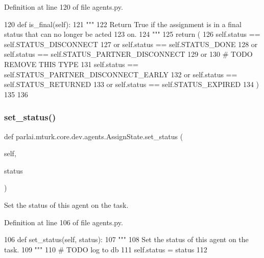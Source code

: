 Definition at line 120 of file agents.\+py.


\begin{DoxyCode}
120     \textcolor{keyword}{def }is\_final(self):
121         \textcolor{stringliteral}{"""}
122 \textcolor{stringliteral}{        Return True if the assignment is in a final status that can no longer be acted}
123 \textcolor{stringliteral}{        on.}
124 \textcolor{stringliteral}{        """}
125         \textcolor{keywordflow}{return} (
126             self.status == self.STATUS\_DISCONNECT
127             \textcolor{keywordflow}{or} self.status == self.STATUS\_DONE
128             \textcolor{keywordflow}{or} self.status == self.STATUS\_PARTNER\_DISCONNECT
129             \textcolor{keywordflow}{or}
130             \textcolor{comment}{# TODO REMOVE THIS TYPE}
131             self.status == self.STATUS\_PARTNER\_DISCONNECT\_EARLY
132             \textcolor{keywordflow}{or} self.status == self.STATUS\_RETURNED
133             \textcolor{keywordflow}{or} self.status == self.STATUS\_EXPIRED
134         )
135 
136 
\end{DoxyCode}
\mbox{\label{classparlai_1_1mturk_1_1core_1_1dev_1_1agents_1_1AssignState_a8a4989ac979fca506d8249d3a749ca0c}} 
\subsubsection{\texorpdfstring{set\+\_\+status()}{set\_status()}}
{\footnotesize\ttfamily def parlai.\+mturk.\+core.\+dev.\+agents.\+Assign\+State.\+set\+\_\+status (\begin{DoxyParamCaption}\item[{}]{self,  }\item[{}]{status }\end{DoxyParamCaption})}

\begin{DoxyVerb}Set the status of this agent on the task.
\end{DoxyVerb}
 

Definition at line 106 of file agents.\+py.


\begin{DoxyCode}
106     \textcolor{keyword}{def }set\_status(self, status):
107         \textcolor{stringliteral}{"""}
108 \textcolor{stringliteral}{        Set the status of this agent on the task.}
109 \textcolor{stringliteral}{        """}
110         \textcolor{comment}{# TODO log to db}
111         self.status = status
112 
\end{DoxyCode}


